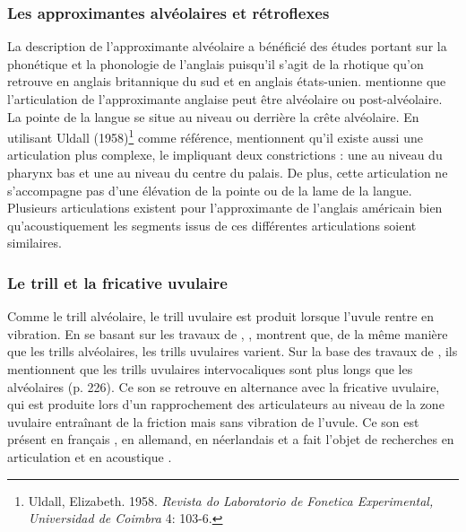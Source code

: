 \subsubsection{Les approximantes alvéolaires et rétroflexes}

La description de l'approximante alvéolaire a bénéficié des études portant sur la phonétique et la phonologie de l'anglais puisqu'il s'agit de la rhotique qu'on retrouve en anglais britannique du sud et en anglais états-unien. \textcite{ladefogedPreliminariesLinguisticPhonetics1971} mentionne que l'articulation de l'approximante anglaise peut être alvéolaire ou post-alvéolaire. La pointe de la langue se situe au niveau ou derrière la crête alvéolaire.
En utilisant Uldall (1958)\footnote{Uldall, Elizabeth. 1958.  \textit{Revista do Laboratorio de Fonetica Experimental, Universidad de Coimbra} 4: 103-6.} comme référence, \textcite[234]{ladefogedSoundsWorldLanguages1996} mentionnent qu'il existe aussi une articulation plus complexe, le  impliquant deux constrictions : une au niveau du pharynx bas et une au niveau du centre du palais. De plus, cette articulation ne s'accompagne pas d'une élévation de la pointe ou de la lame de la langue. Plusieurs articulations existent pour l'approximante de l'anglais américain bien qu'acoustiquement les segments issus de ces différentes articulations soient similaires.

\subsubsection{Le trill et la fricative uvulaire}

Comme le trill alvéolaire, le trill uvulaire est produit lorsque l'uvule rentre en vibration. 
En se basant sur les travaux de \textcite{delattrePharyngealFeaturesConsonants1971}, \textcite{ladefogedSoundsWorldLanguages1996}, montrent que, de la même manière que les trills alvéolaires, les trills uvulaires varient. Sur la base des travaux de \citeauthor{lindauStory1985}, ils mentionnent que les trills uvulaires intervocaliques sont plus longs que les alvéolaires (p. 226).
Ce son se retrouve en alternance avec la fricative uvulaire, qui est produite lors d'un rapprochement des articulateurs au niveau de la zone uvulaire entraînant de la friction mais sans vibration de l'uvule. Ce son est présent en français \parencite{lancasterBeginningsFrenchUvular1934,hambyePrononciationFrancaisContemporain2005,prematRouleFrancaisDans2018}, en allemand, en néerlandais \parencite{sebregtsSociophoneticsPhonologyDutch2014} et a fait l'objet de recherches en articulation et en acoustique \parencite{gendrotArticulatoryAcousticRealization2016}.


